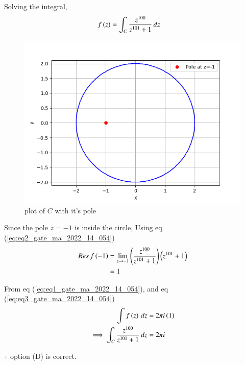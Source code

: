 \documentclass[journal,12pt,twocolumn]{IEEEtran}
\begin{document}
Solving the integral,
\begin{align}
f\left(z\right) &= \int_C \frac{z^{100}}{z^{101}+1}\, dz
\end{align}

\begin{figure}[ht]
    \centering
    \includegraphics[width=\columnwidth]{figs/Figure_1.png}
    \caption{plot of $C$ with it's pole}
    \label{fig:fig1_gate_ma_2022_14_054}
\end{figure}
Since the pole $z=-1$ is inside the circle, Using eq (\ref{eq:eq2_gate_ma_2022_14_054})
\begin{align}
    Res\, f\left(-1\right) &= \lim_{z\to -1}\left(\frac{z^{100}}{z^{101}+1}\right)\left(z^{101} + 1\right)\\
    &= 1 \label{eq:eq3_gate_ma_2022_14_054}
\end{align}

From eq (\ref{eq:eq1_gate_ma_2022_14_054}), and eq (\ref{eq:eq3_gate_ma_2022_14_054})
\begin{align}
    \int f\left(z\right)\, dz &= 2\pi i \left(1\right)\\
    \implies \int_C \frac{z^{100}}{z^{101}+1}\, dz &= 2 \pi i
\end{align}

$\therefore$ option (D) is correct.
\end{document}
